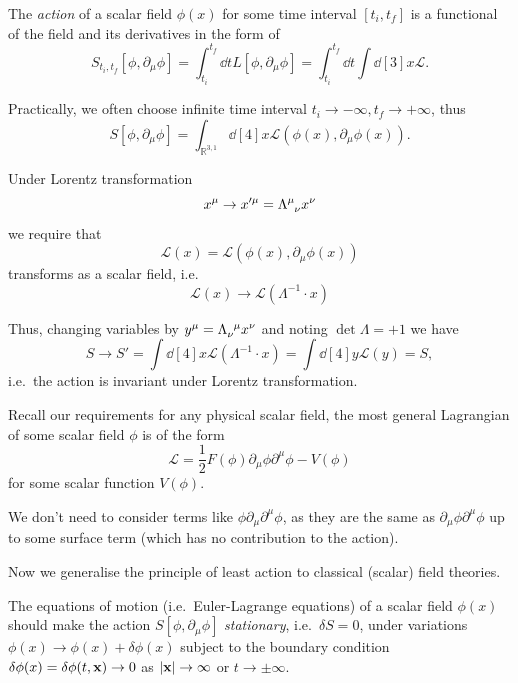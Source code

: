 \documentclass[a4paper,11pt]{article}
\begin{document}
	\begin{defi}
		The \emph{action} of a scalar field $\phi(x)$ for some time interval $[t_i,t_f]$ is a functional of the field and its derivatives in the form of
		\begin{equation}
			S_{t_i,t_f}[\phi, \partial_\mu \phi] = \int_{t_i}^{t_f} \dd{t} L[\phi, \partial_\mu \phi] = \int_{t_i}^{t_f} \dd{t} \int \dd[3]{x} \mathcal{L}.
		\end{equation}

		Practically, we often choose infinite time interval $t_i \to - \infty, t_f \to +\infty$, thus
		\begin{equation}
			S[\phi, \partial_\mu \phi] = \int_{\mathbb{R}^{3,1}} \dd[4]{x} \mathcal{L}(\phi(x),\partial_\mu \phi(x)).
		\end{equation}
	\end{defi}

	Under Lorentz transformation 
	\[
		x^\mu \to x'^\mu = \LT{\mu}{\nu} x^\nu
	\]
	we require that
	\[
		\mathcal{L}(x) = \mathcal{L}(\phi(x), \partial_\mu \phi(x))
	\]
	transforms as a scalar field, i.e.\ 
	\[
		\mathcal{L}(x) \to \mathcal{L}(\Lambda^{-1} \cdot x)
	\]
	
	Thus, changing variables by $y^\mu = \iLT{\nu}{\mu}x^\nu$ and noting $\det \Lambda = +1$ we have
	\[
		S \to S' = \int \dd[4]{x} \mathcal{L}(\Lambda^{-1} \cdot x) = \int \dd[4]{y} \mathcal{L}(y) = S,
	\]
	i.e.\ the action is invariant under Lorentz transformation.

	Recall our requirements for any physical scalar field, the most general Lagrangian of some scalar field $\phi$ is of the form
	\begin{equation}
		\mathcal{L} = \frac{1}{2} F(\phi) \partial_\mu \phi \partial^\mu \phi - V(\phi)
	\end{equation}
	for some scalar function $V(\phi)$.

	\begin{nt}
		We don't need to consider terms like $\phi \partial_\mu \partial^\mu \phi$, as they are the same as $\partial_\mu \phi \partial^\mu \phi$ up to some surface term (which has no contribution to the action).
	\end{nt}

	Now we generalise the principle of least action to classical (scalar) field theories.

	\begin{pos}
		The equations of motion (i.e.\ Euler-Lagrange equations) of a scalar field $\phi(x)$ should make the action $S[\phi,\partial_\mu \phi]$ \emph{stationary}, i.e.\ $\delta S = 0$, under variations $\phi(x) \to \phi(x) + \delta \phi(x)$ subject to the boundary condition $\delta \phi(x) = \delta \phi(t,\vb x) \to 0$ as $\abs{\vb x} \to \infty$ or $t \to \pm \infty$.
	\end{pos}
\end{document}
